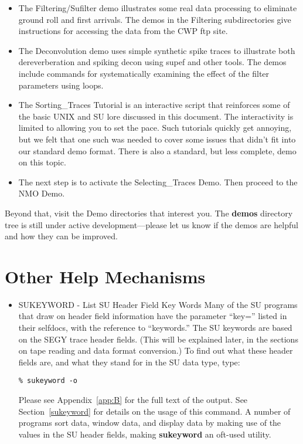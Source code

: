{{{\begin{itemize}
\item The Filtering/Sufilter demo illustrates some real data processing to
eliminate ground roll and first arrivals.  The demos in the
Filtering subdirectories give instructions for accessing the data
from the CWP ftp site.

\item The Deconvolution demo uses simple synthetic spike traces to
illustrate both dereverberation and spiking decon using supef and
other tools.  The demos include commands for systematically
examining the effect of the filter parameters using loops.

\item The Sorting\_Traces Tutorial is an interactive script that
reinforces some of the basic UNIX and {\small\sf SU} lore discussed in this
document.  The interactivity is limited to allowing you to set the
pace.  Such tutorials quickly get annoying, but we felt that one
such was needed to cover some issues that didn't fit into our
standard demo format.  There is also a standard, but less complete,
demo on this topic.

\item The next step is to activate the Selecting\_Traces Demo.  Then
proceed to the NMO Demo. 
\end{itemize}
Beyond that, visit the Demo directories
that interest you.  The {\bf demos\/} directory tree is still under
active development---please let us know if the demos are helpful and
how they can be improved.

\section{Other Help Mechanisms}

\begin{itemize}
\item SUKEYWORD - List SU Header Field Key Words
Many of the SU programs that draw on header field information
have the parameter ``key='' listed in their selfdocs, with
the reference to ``keywords.''
The SU keywords are based on the SEGY trace header fields.
(This will be explained later, in the sections on tape reading
and data format conversion.)
To find out what these header fields are, and what they stand
for in the SU data type, type:
{ \small\begin{verbatim} 
% sukeyword -o
\end{verbatim} } \noindent
Please see Appendix~\ref{app:B} for the full text of the output. 
See Section~\ref{sukeyword} for details on the usage of this
command.  A number of programs sort data, window data, and display data
by making use of the values in the SU header fields, making
{\bf sukeyword\/} an oft-used utility.


\end{itemize}}}}

